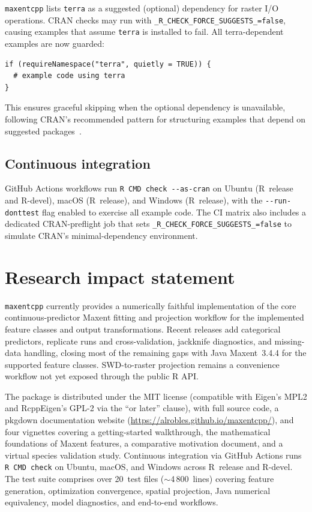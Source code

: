 \documentclass[10pt,letterpaper]{article}
\begin{document}
\texttt{maxentcpp} lists \texttt{terra} as a suggested (optional)
dependency for raster I/O operations.
CRAN checks may run with \texttt{\_R\_CHECK\_FORCE\_SUGGESTS\_=false},
causing examples that assume \texttt{terra} is installed to fail.
All terra-dependent examples are now guarded:

\begin{verbatim}
if (requireNamespace("terra", quietly = TRUE)) {
  # example code using terra
}
\end{verbatim}

This ensures graceful skipping when the optional dependency is
unavailable, following CRAN's recommended pattern for structuring
examples that depend on suggested packages~\cite{CRANcookbook2024}.

\subsection*{Continuous integration}

GitHub Actions workflows run \texttt{R CMD check -{}-as-cran} on Ubuntu
(R~release and R-devel), macOS (R~release), and Windows (R~release),
with the \texttt{-{}-run-donttest} flag enabled to exercise all example
code.
The CI matrix also includes a dedicated CRAN-preflight job that sets
\texttt{\_R\_CHECK\_FORCE\_SUGGESTS\_=false} to simulate CRAN's
minimal-dependency environment.

\section*{Research impact statement}

\texttt{maxentcpp} currently provides a numerically faithful
implementation of the core continuous-predictor Maxent fitting and
projection workflow for the implemented feature classes and output
transformations.
Recent releases add categorical predictors, replicate runs and
cross-validation, jackknife diagnostics, and missing-data handling,
closing most of the remaining gaps with Java Maxent~3.4.4 for the
supported feature classes.
SWD-to-raster projection remains a convenience workflow not yet exposed
through the public R API.

The package is distributed under the MIT license (compatible with
Eigen's MPL2 and RcppEigen's GPL-2 via the ``or later'' clause), with
full source code, a pkgdown documentation website
(\url{https://alrobles.github.io/maxentcpp/}), and four vignettes
covering a getting-started walkthrough, the mathematical foundations of
Maxent features, a comparative motivation document, and a virtual
species validation study.
Continuous integration via GitHub Actions runs \texttt{R CMD check} on
Ubuntu, macOS, and Windows across R~release and R-devel.
The test suite comprises over 20~test files ($\sim$4\,800~lines)
covering feature generation, optimization convergence, spatial
projection, Java numerical equivalency, model diagnostics, and
end-to-end workflows.
\end{document}
